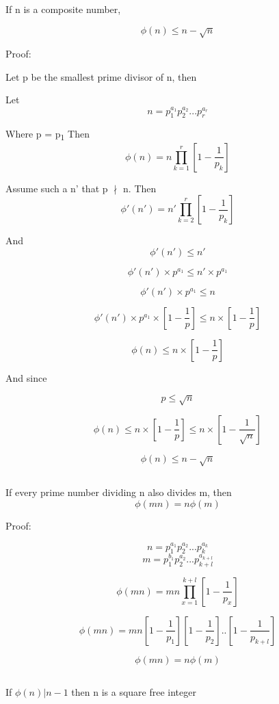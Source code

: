 \documentclass{article}
\begin{document}
If n is a composite number, 

\[
    \phi(n) \leq n - \sqrt{n}
\]

Proof:

Let p be the smallest prime divisor of n, then 

Let
\[
    n = p_1^{a_1} p_2^{a_2} . . . p_r^{a_r}
\]

Where p = p\textsubscript{1}
Then
\[
    \phi(n) = n \prod_{k=1}^{r} [1 - \frac{1}{p_k}]
\]

Assume such a n' that p \(\nmid\) n.
Then
\[
    \phi'(n') = n' \prod_{k=2}^{r} [1 - \frac{1}{p_k}]
\]

And
\[
    \phi'(n') \leq n'
\]

\[
    \phi'(n') \times p^{a_1} \leq n' \times p^{a_1}
\]

\[
    \phi'(n') \times p^{a_1} \leq n
\]

\[
    \phi'(n') \times p^{a_1} \times [1 - \frac{1}{p}] \leq n \times [1 - \frac{1}{p}]
\]

\[
    \phi(n) \leq  n \times [1 - \frac{1}{p}]
\]

And since 

\[
    p \leq \sqrt{n}
\]

\[
    \phi(n) \leq  n \times [1 - \frac{1}{p}] \leq n \times [1 - \frac{1}{\sqrt{n}}]
\]

\[
    \phi(n) \leq n - \sqrt{n}
\]

\subsection{}

If every prime number dividing n also divides m, then
\[
    \phi(mn) = n \phi(m)
\]

Proof:

\[
     n = p_1^{a_1} p_2^{a_2} . . . p_k^{a_k}
\]
\[
    m = p_1^{b_1} p_2^{a_2} . . . p_{k+l}^{a_{k+l}}
\]

\[
    \phi(mn) = mn \prod_{x=1}^{k+l} [1 - \frac{1}{p_x}]
\]

\[
    \phi(mn) = mn [1 - \frac{1}{p_1}] [1 - \frac{1}{p_2}] . . [1 - \frac{1}{p_{k+l}}]
\]

\[
    \phi(mn) = n \phi(m)
\]

\subsection{}

If \(\phi(n) \vert {n-1}\) then n is a square free integer
\end{document}
